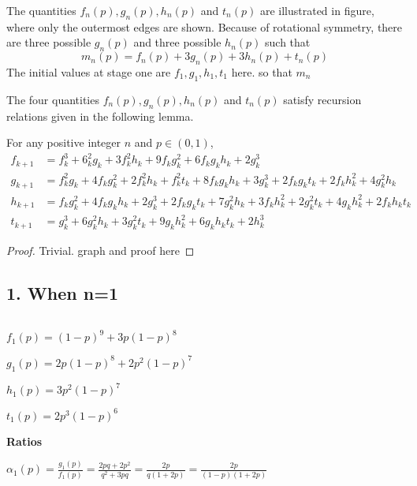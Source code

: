 The quantities $f_n(p), g_n(p), h_n(p)$ and $t_n(p)$ are illustrated in figure, where only the outermost edges are shown. Because of rotational symmetry, there are three possible $g_n(p)$ and three possible $h_n(p)$ such that
$$m_n(p) = f_n(p) + 3g_n(p) + 3h_n(p) + t_n(p)$$
The initial values at stage one are {\color{red} $f_1,g_1,h_1,t_1$ here.} so that {\color{red}$m_n$}

The four quantities $f_n(p), g_n(p), h_n(p)$ and $t_n(p)$ satisfy recursion relations given in the following lemma.

\begin{lemma}\label{def:cc}
For any positive integer $n$ and $p \in (0,1)$,
\begin{align}
f_{k+1} &= f_k^3 + 6_k^2g_k + 3f_k^2h_k + 9f_kg_k^2 + 6f_kg_kh_k + 2g_k^3\\
g_{k+1} &= f_k^2g_k + 4f_kg_k^2 + 2f_k^2h_k + f_k^2t_k + 8f_kg_kh_k + 3g_k^3 + 2f_kg_kt_k + 2f_kh_k^2 + 4g_k^2h_k\\
h_{k+1} &= f_kg_k^2 + 4f_kg_kh_k + 2g_k^3 + 2f_kg_kt_k + 7g_k^2h_k + 3f_kh_k^2 + 2g_k^2t_k + 4g_kh_k^2 + 2f_kh_kt_k\\
t_{k+1} &= g_k^3 + 6g_k^2h_k + 3g_k^2t_k + 9g_kh_k^2 + 6g_kh_kt_k + 2h_k^3
\end{align}
\end{lemma}

\begin{proof}
Trivial. {\color{red} graph and proof here}
\end{proof}








\newpage



\subsection*{1. When n=1}$ $

$f_1(p) = (1-p)^9 + 3p(1-p)^8$

$g_1(p) = 2p(1-p)^8 + 2p^2(1-p)^7$

$h_1(p) = 3p^2(1-p)^7$

$t_1(p) = 2p^3(1-p)^6$

\textbf{Ratios}

$\alpha_1(p)=\frac{g_1(p)}{f_1(p)} = \frac{2pq + 2p^2}{q^2+3pq} = \frac{2p}{q(1+2p)} = \frac{2p}{(1-p)(1+2p)}$

